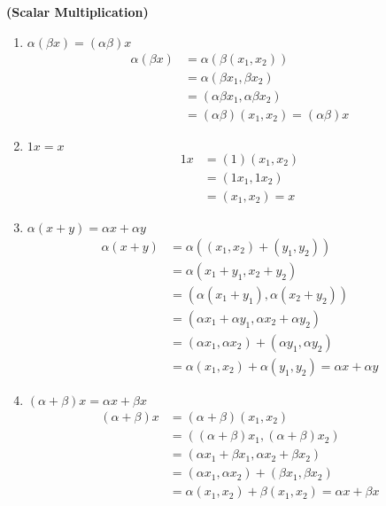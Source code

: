 \documentclass[12pt]{article}
\begin{document}
\textbf{(Scalar Multiplication)}
\begin{enumerate}
    \item $\alpha(\beta x) = (\alpha \beta)x$
        \begin{align*}
            \alpha(\beta x) &= \alpha(\beta(x_1,x_2)) \\
            &= \alpha(\beta x_1, \beta x_2) \\
            &= (\alpha \beta x_1, \alpha \beta x_2) \\
            &= (\alpha \beta)(x_1,x_2) = (\alpha \beta)x
        \end{align*}
    \item $1x = x$
        \begin{align*}
            1x &= (1)(x_1,x_2) \\
            &= (1x_1,1x_2) \\
            &= (x_1,x_2) = x
        \end{align*}
    \item $\alpha(x + y) = \alpha x + \alpha y$
        \begin{align*}
            \alpha(x + y) &= \alpha((x_1,x_2) + (y_1,y_2)) \\
            &= \alpha(x_1+y_1, x_2+y_2) \\
            &= (\alpha(x_1+y_1), \alpha(x_2+y_2)) \\
            &= (\alpha x_1 + \alpha y_1, \alpha x_2 + \alpha y_2) \\
            &= (\alpha x_1, \alpha x_2) + (\alpha y_1, \alpha y_2) \\
            &= \alpha(x_1,x_2) + \alpha(y_1,y_2) = \alpha x + \alpha y
        \end{align*}
    \item $(\alpha + \beta)x = \alpha x + \beta x$
        \begin{align*}
            (\alpha + \beta)x &= (\alpha + \beta)(x_1,x_2) \\
            &= ((\alpha+\beta)x_1, (\alpha+\beta)x_2) \\
            &= (\alpha x_1 + \beta x_1, \alpha x_2 + \beta x_2) \\
            &= (\alpha x_1, \alpha x_2) + (\beta x_1, \beta x_2) \\
            &= \alpha(x_1,x_2) + \beta(x_1,x_2) = \alpha x + \beta x
        \end{align*}
\end{enumerate}
\end{document}

